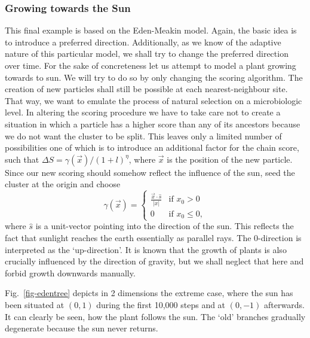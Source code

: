 \documentclass[twocolumn,10pt]{scrartcl}
\begin{document}
            \subsubsection{Growing towards the Sun}
                This final example is based on the Eden-Meakin model. Again, the basic idea is to introduce a preferred
                direction. Additionally, as we know of the adaptive nature of this particular model, we shall try to
                change the preferred direction over time. For the sake of concreteness let us attempt to model a plant
                growing towards to sun. We will try to do so by only changing the scoring algorithm. The creation of
                new particles shall still be possible at each nearest-neighbour site. That way, we want to emulate the
                process of natural selection on a microbiologic level. In altering the scoring procedure we have to take
                care not to create a situation in which a particle has a higher score than any of its ancestors because
                we do not want the cluster to be split. This leaves only a limited number of possibilities one of which
                is to introduce an additional factor for the chain score, such that $\Delta S=\gamma(\vec x)/(1+l)^\eta$,
                where $\vec x$ is the position of the new particle. Since our new scoring should somehow reflect the
                influence of the sun, seed the cluster at the origin and choose
                \begin{equation*}
                    \gamma(\vec x)=
                    \begin{cases}
                            \frac{\vec x\cdot \hat s}{|x|}  & \text{if $x_0>0$} \\
                            0 & \text{if $x_0\le 0$},
                    \end{cases}
                \end{equation*}
                where $\hat s$ is a unit-vector pointing into the direction of the sun. This reflects the fact
                that sunlight reaches the earth essentially as parallel rays. The 0-direction is
                interpreted as the `up-direction'. It is known that the growth
                of plants is also crucially influenced by the direction of gravity, but we shall neglect that here
                and forbid growth downwards manually.

                Fig.~\ref{fig-edentree} depicts in 2 dimensions the extreme case, where the sun has been situated
                at $(0,1)$ during the first 10,000 steps and at $(0, -1)$ afterwards. It can clearly be seen, how
                the plant follows the sun. The `old' branches gradually degenerate because the sun never returns.
\end{document}

